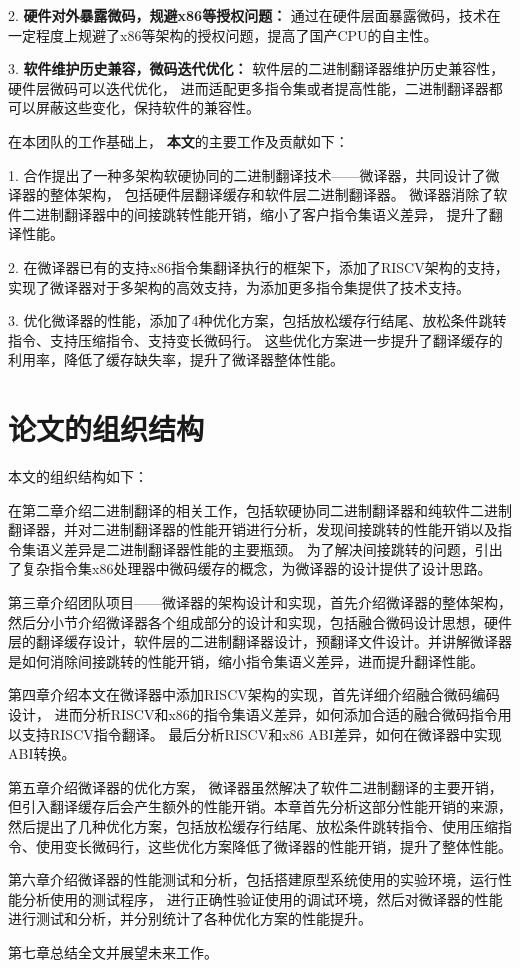 2. \textbf{硬件对外暴露微码，规避x86等授权问题：} 通过在硬件层面暴露微码，技术在一定程度上规避了x86等架构的授权问题，提高了国产CPU的自主性。

3. \textbf{软件维护历史兼容，微码迭代优化：} 软件层的二进制翻译器维护历史兼容性，硬件层微码可以迭代优化，
进而适配更多指令集或者提高性能，二进制翻译器都可以屏蔽这些变化，保持软件的兼容性。

在本团队的工作基础上，
\textbf{本文}的主要工作及贡献如下：

1. 合作提出了一种多架构软硬协同的二进制翻译技术——微译器，共同设计了微译器的整体架构，
包括硬件层翻译缓存和软件层二进制翻译器。
微译器消除了软件二进制翻译器中的间接跳转性能开销，缩小了客户指令集语义差异，
提升了翻译性能。

2. 在微译器已有的支持x86指令集翻译执行的框架下，添加了RISCV架构的支持，
实现了微译器对于多架构的高效支持，为添加更多指令集提供了技术支持。

3. 优化微译器的性能，添加了4种优化方案，包括放松缓存行结尾、放松条件跳转指令、支持压缩指令、支持变长微码行。
这些优化方案进一步提升了翻译缓存的利用率，降低了缓存缺失率，提升了微译器整体性能。


\section{论文的组织结构}

本文的组织结构如下：

在第二章介绍二进制翻译的相关工作，包括软硬协同二进制翻译器和纯软件二进制翻译器，并对二进制翻译器的性能开销进行分析，发现间接跳转的性能开销以及指令集语义差异是二进制翻译器性能的主要瓶颈。
为了解决间接跳转的问题，引出了复杂指令集x86处理器中微码缓存的概念，为微译器的设计提供了设计思路。

第三章介绍团队项目——微译器的架构设计和实现，首先介绍微译器的整体架构，
然后分小节介绍微译器各个组成部分的设计和实现，包括融合微码设计思想，硬件层的翻译缓存设计，软件层的二进制翻译器设计，预翻译文件设计。并讲解微译器是如何消除间接跳转的性能开销，缩小指令集语义差异，进而提升翻译性能。

第四章介绍本文在微译器中添加RISCV架构的实现，首先详细介绍融合微码编码设计，
进而分析RISCV和x86的指令集语义差异，如何添加合适的融合微码指令用以支持RISCV指令翻译。
最后分析RISCV和x86 ABI差异，如何在微译器中实现ABI转换。

第五章介绍微译器的优化方案，
微译器虽然解决了软件二进制翻译的主要开销，但引入翻译缓存后会产生额外的性能开销。本章首先分析这部分性能开销的来源，然后提出了几种优化方案，包括放松缓存行结尾、放松条件跳转指令、使用压缩指令、使用变长微码行，这些优化方案降低了微译器的性能开销，提升了整体性能。

第六章介绍微译器的性能测试和分析，包括搭建原型系统使用的实验环境，运行性能分析使用的测试程序，
进行正确性验证使用的调试环境，然后对微译器的性能进行测试和分析，并分别统计了各种优化方案的性能提升。

第七章总结全文并展望未来工作。
